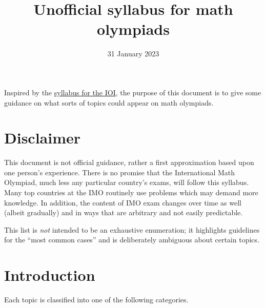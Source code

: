 \documentclass[11pt]{scrartcl}
\begin{document}
\title{Unofficial syllabus for math olympiads}
\date{31 January 2023}
\maketitle

Inspired by the \href{https://ioinformatics.org/files/ioi-syllabus-2019.pdf}
{syllabus for the IOI},
the purpose of this document is to give some guidance
on what sorts of topics could appear on math olympiads.

\section{Disclaimer}
\alert{This document is not official guidance},
rather a first approximation based upon one person's experience.
There is no promise that the International Math Olympiad,
much less any particular country's exams,
will follow this syllabus.
Many top countries at the IMO routinely use problems
which may demand more knowledge.
In addition, the content of IMO exam changes over time as well
(albeit gradually) and in ways that are arbitrary and not easily predictable.

This list is \emph{not} intended to be an exhaustive enumeration;
it highlights guidelines for the ``most common cases''
and is deliberately ambiguous about certain topics.

\section{Introduction}
Each topic is classified into one of the following categories.
\end{document}
